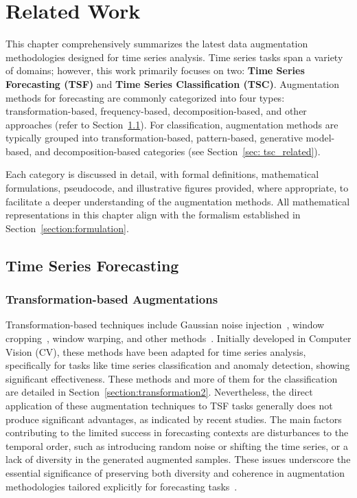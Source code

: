 \chapter{Related Work}



This chapter comprehensively summarizes the latest data augmentation methodologies designed for time series analysis. Time series tasks span a variety of domains; however, this work primarily focuses on two: \textbf{Time Series Forecasting (TSF)} and \textbf{Time Series Classification (TSC)}. Augmentation methods for forecasting are commonly categorized into four types: transformation-based, frequency-based, decomposition-based, and other approaches (refer to Section~\ref{sec: tsf_related}). For classification, augmentation methods are typically grouped into transformation-based, pattern-based, generative model-based, and decomposition-based categories (see Section~\ref{sec: tsc_related}).


Each category is discussed in detail, with formal definitions, mathematical formulations, pseudocode, and illustrative figures provided, where appropriate, to facilitate a deeper understanding of the augmentation methods. All mathematical representations in this chapter align with the formalism established in Section~\ref{section:formulation}.




\section{Time Series Forecasting } \label{sec: tsf_related}

\subsection{Transformation-based Augmentations} \label{section:transformation}


Transformation-based techniques include Gaussian noise injection~\cite{wen2019timeseriesanomalydetection}, window cropping~\cite{cui2016multiscaleconvolutionalneuralnetworks, Wen_2021}, window warping, and other methods~\cite{Wen_2021}. Initially developed in Computer Vision (CV), these methods have been adapted for time series analysis, specifically for tasks like time series classification and anomaly detection, showing significant effectiveness. These methods and more of them for the classification are detailed in Section~\ref{section:transformation2}. Nevertheless, the direct application of these augmentation techniques to TSF tasks generally does not produce significant advantages, as indicated by recent studies. The main factors contributing to the limited success in forecasting contexts are disturbances to the temporal order, such as introducing random noise or shifting the time series, or a lack of diversity in the generated augmented samples. These issues underscore the essential significance of preserving both diversity and coherence in augmentation methodologies tailored explicitly for forecasting tasks~\cite{Wen_2021, chen2023fraugfrequencydomainaugmentation, zhang2023diversecoherentaugmentationtimeseries, zhao2024dominantshufflesimplepowerful}. 



